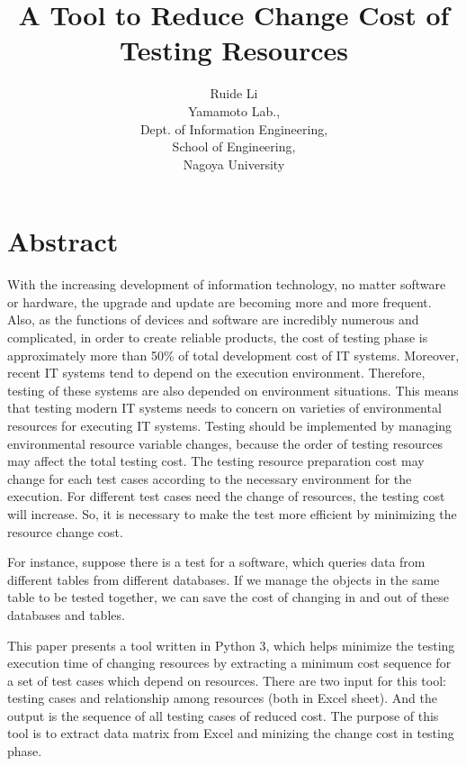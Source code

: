 \documentclass[12pt,a4paper]{article}
\begin{document}
\title{A Tool to Reduce Change Cost of Testing Resources}
\author{Ruide Li\\Yamamoto Lab.,\\Dept. of Information Engineering, \\School of Engineering, \\Nagoya University}
\date{}
\maketitle

\section{Abstract}

With the increasing development of information technology, no matter software or hardware, the upgrade and update are becoming more and more frequent. Also, as the functions of devices and software are incredibly numerous and complicated, in order to create reliable products, the cost of testing phase is approximately more than 50\% of total development cost of IT systems. Moreover, recent IT systems tend to depend on the execution environment. Therefore, testing of these systems are also depended on environment situations. This means that testing modern IT systems needs to concern on varieties of environmental resources for executing IT systems. Testing should be implemented by managing environmental resource variable changes, because the order of testing resources may affect the total testing cost. The testing resource preparation cost may change for each test cases according to the necessary environment for the execution. For different test cases need the change of resources, the testing cost will increase. So, it is necessary to make the test more efficient by minimizing the resource change cost. 

For instance, suppose there is a test for a software, which queries data from different tables from different databases. If we manage the objects in the same table to be tested together, we can save the cost of changing in and out of these databases and tables.

This paper presents a tool written in Python 3, which helps minimize the testing execution time of changing resources by extracting a minimum cost sequence for a set of test cases which depend on resources. There are two input for this tool: testing cases and relationship among resources (both in Excel sheet). And the output is the sequence of all testing cases of reduced cost. The purpose of this tool is to extract data matrix from Excel and minizing the change cost in testing phase.
\end{document}
